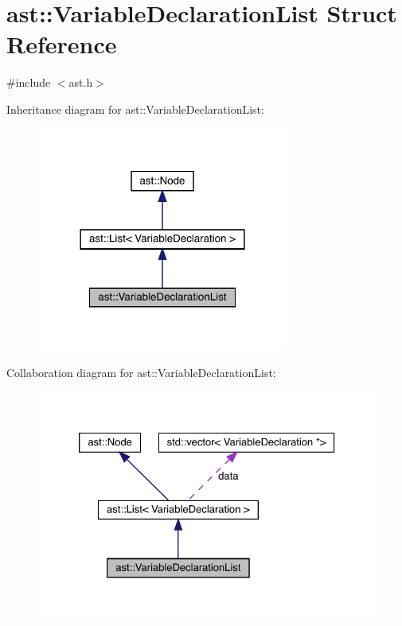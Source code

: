 \hypertarget{structast_1_1_variable_declaration_list}{}\section{ast\+:\+:Variable\+Declaration\+List Struct Reference}
\label{structast_1_1_variable_declaration_list}


{\ttfamily \#include $<$ast.\+h$>$}



Inheritance diagram for ast\+:\+:Variable\+Declaration\+List\+:
\nopagebreak
\begin{figure}[H]
\begin{center}
\leavevmode
\includegraphics[width=234pt]{structast_1_1_variable_declaration_list__inherit__graph}
\end{center}
\end{figure}


Collaboration diagram for ast\+:\+:Variable\+Declaration\+List\+:
\nopagebreak
\begin{figure}[H]
\begin{center}
\leavevmode
\includegraphics[width=326pt]{structast_1_1_variable_declaration_list__coll__graph}
\end{center}
\end{figure}
